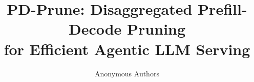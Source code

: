 \documentclass[11pt]{article}
\title{PD-Prune: Disaggregated Prefill-Decode Pruning\\
for Efficient Agentic LLM Serving}
\author{Anonymous Authors}
\begin{document}
\maketitle

\begin{abstract}

\end{abstract}










\appendix




\end{document}
